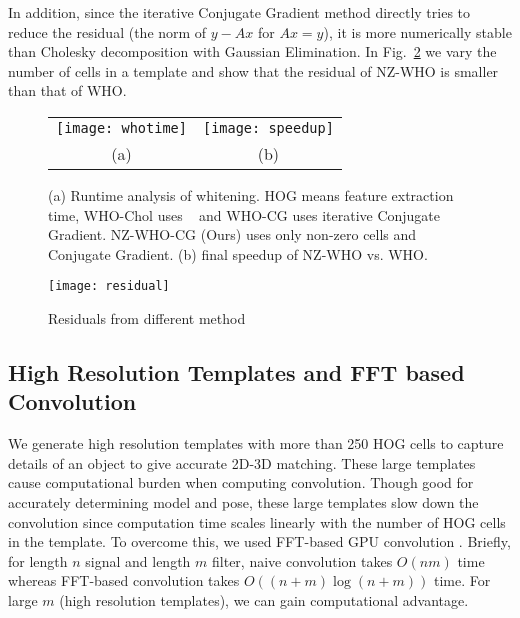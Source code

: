 In addition, since the iterative Conjugate Gradient method directly
tries to reduce the residual (the norm of $y-Ax$ for $Ax = y$), it is
more numerically stable than Cholesky decomposition with Gaussian
Elimination. In Fig.~\ref{fig:whoresidual} we vary the number of cells in a template and show that
the residual of NZ-WHO is smaller than that of WHO.

\begin{figure}[t]
  \begin{center}
  \begin{tabular}{cc}
     \texttt{[image: whotime]} & 
     \texttt{[image: speedup]}\\
     (a) & (b) \\
 \end{tabular}
  \end{center}
  \caption{(a) Runtime analysis of whitening. HOG means feature
    extraction time, WHO-Chol uses ~\cite{Hariharan12} and
    WHO-CG uses iterative Conjugate Gradient. NZ-WHO-CG (Ours) uses only
    non-zero cells and Conjugate Gradient. (b) final speedup
    of NZ-WHO vs. WHO.}
  \label{fig:whotime}
\end{figure}
%
\begin{figure}[t]
  \centering
  \texttt{[image: residual]}
  \caption{Residuals from different method}
  \label{fig:whoresidual}
\end{figure}


\subsection{High Resolution Templates and FFT based Convolution}
\label{sec:fft} 

We generate high resolution templates with more than 250 HOG cells to capture
details of an object to give accurate 2D-3D matching. These large templates
cause computational burden when computing convolution. Though good for
accurately determining model and pose, these large templates slow down the convolution since computation time scales linearly with the number of HOG
cells in the template. To overcome this, we used FFT-based GPU convolution \cite{Podlozhnyuk}. Briefly, for length $n$
signal and length $m$ filter, naive convolution takes $O(nm)$ time whereas
FFT-based convolution takes $O\left( (n + m)\log (n+m) \right)$ time. For large
$m$ (high resolution templates), we can gain computational advantage.
